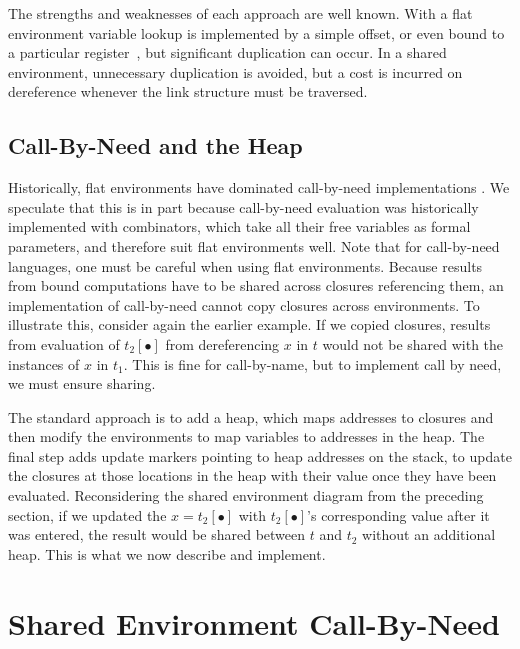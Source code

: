 \documentclass[preprint]{sigplanconf}
\begin{document}
The strengths and weaknesses of each approach are well known.  With a flat
environment variable lookup is implemented by a simple offset, or even
bound to a particular register~\cite{jonesstg, appel2006compiling},
but significant duplication can occur.  In a shared environment, unnecessary
duplication is avoided, but a cost is incurred on dereference whenever the
link structure must be traversed.

\subsection{Call-By-Need and the Heap}

Historically, flat environments have dominated call-by-need implementations
\cite{jonesstg, TIM, johnsson1984efficient,
boquist1997grin}. We speculate that this is in part because call-by-need
evaluation was historically implemented with combinators, which take all their
free variables as formal parameters, and therefore suit flat environments well.
Note that for call-by-need languages, one must be careful when using flat
environments.  Because results from bound computations have to be shared across
closures referencing them, an implementation of call-by-need cannot copy
closures across environments. To illustrate this, consider again the earlier
example.  If we copied closures, results from evaluation of $t_2[\bullet]$ from
dereferencing $x$ in $t$ would not be shared with the instances of $x$ in
$t_1$.  This is fine for call-by-name, but to implement call by need, we must
ensure sharing.

The standard approach is to add a heap, which maps addresses to closures
\cite{jonesstg, TIM, johnsson1984efficient, sestoft} and then
modify the environments to map variables to addresses in the heap. The final
step adds update markers pointing to heap addresses on the stack, to update
the closures at those locations in the heap with their value once they have been
evaluated.  Reconsidering
the shared
environment diagram from the preceding section, if we updated the
$x=t_2[\bullet]$ with $t_2[\bullet]$'s corresponding value after it was
entered, the result would be shared between $t$ and $t_2$ without
an additional heap. This is what we now describe and implement.

\section{Shared Environment Call-By-Need} \label{sec:calc}
\end{document}
